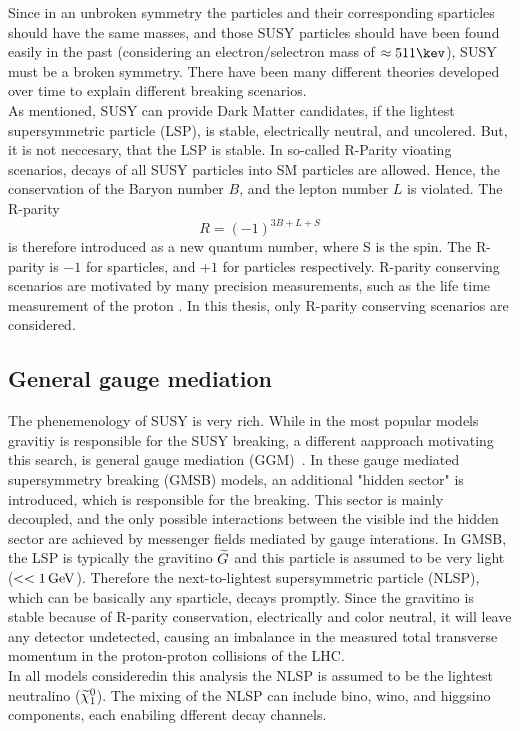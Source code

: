 Since in an unbroken symmetry the particles and their corresponding sparticles should have the same masses, and those SUSY particles should have been found easily in the past (considering \eg an electron/selectron mass of $\approx511\kev$),  SUSY must be a broken symmetry. There have been many different theories developed over time to explain different breaking scenarios.\\
As mentioned, SUSY can provide Dark Matter candidates, if the lightest supersymmetric particle (LSP), is stable, electrically neutral, and uncolered. But, it is not neccesary, that the LSP is stable. In so-called R-Parity vioating scenarios, decays of all SUSY particles into SM particles are allowed. Hence, the conservation of the Baryon number $B$, and the lepton number $L$ is violated. The R-parity
\begin{equation}
 R = (-1)^{3B+L+S}
\end{equation}
is therefore introduced as a new quantum number, where S is the spin. The R-parity is $-1$ for sparticles, and $+1$ for particles respectively. R-parity conserving scenarios are motivated by many precision measurements, such as the life time measurement of the proton .
In this thesis, only R-parity conserving scenarios are considered.\\



\subsection{General gauge mediation}\label{sec:GGM}
The phenemenology of SUSY is very rich. While in the most popular models gravitiy is responsible for the SUSY breaking, a different aapproach motivating this search, is general gauge mediation (GGM)~. In these gauge mediated supersymmetry breaking (GMSB) models, an additional "hidden sector" is introduced, which is responsible for the breaking. This sector is mainly decoupled, and the only possible interactions between the visible ind the hidden sector are achieved by messenger fields mediated by gauge interations. In GMSB, the LSP is typically the gravitino $\widetilde{G}$ and this particle is assumed to be very light ($<<1\,\text{Ge\hspace{-.08em}V}$). Therefore the next-to-lightest supersymmetric particle (NLSP), which can be basically any sparticle, decays promptly. Since the gravitino is stable because of R-parity conservation, electrically and color neutral, it will leave any detector undetected, causing an imbalance in the measured total transverse momentum in \eg the proton-proton collisions of the LHC.\\
In all models consideredin this analysis the NLSP is assumed to be the lightest neutralino ($\widetilde{\chi}^{0}_{1}$). The mixing of the NLSP can include bino, wino, and higgsino components, each enabiling dfferent decay channels.


